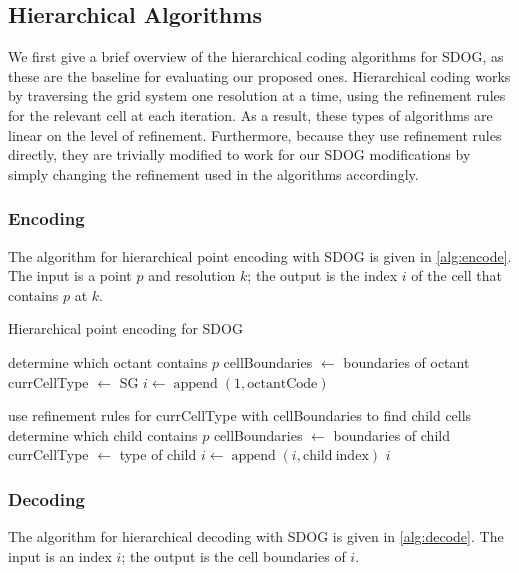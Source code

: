 \subsection{Hierarchical Algorithms}
We first give a brief overview of the hierarchical coding algorithms for SDOG, as these are the baseline for evaluating our proposed ones.
Hierarchical coding works by traversing the grid system one resolution at a time, using the refinement rules for the relevant cell at each iteration.
As a result, these types of algorithms are linear on the level of refinement.
Furthermore, because they use refinement rules directly, they are trivially modified to work for our SDOG modifications by simply changing the refinement used in the algorithms accordingly.


\subsubsection{Encoding}
The algorithm for hierarchical point encoding with SDOG is given in \cref{alg:encode}.
The input is a point $p$ and resolution $k$; the output is the index $i$ of the cell that contains $p$ at $k$.


\begin{algorithm}[htp!]
	\caption{Hierarchical point encoding for SDOG}
	
	\begin{algorithmic}
		
		\STATE determine which octant contains $p$
		\STATE cellBoundaries $\leftarrow$ boundaries of octant
		\STATE currCellType $\leftarrow$ SG
		\STATE $i \leftarrow \operatorname{append}(1, \mathrm{octantCode})$
		
		\STATE use refinement rules for currCellType with cellBoundaries to find child cells
		\STATE determine which child contains $p$
		\STATE cellBoundaries $\leftarrow$ boundaries of child
		\STATE currCellType $\leftarrow$ type of child
		\STATE $i \leftarrow \operatorname{append}(i, \mathrm{child~index})$
		\ENDFOR
		\RETURN $i$
		
	\end{algorithmic}
	\label{alg:encode}
\end{algorithm}


\subsubsection{Decoding}
The algorithm for hierarchical decoding with SDOG is given in \cref{alg:decode}.
The input is an index $i$; the output is the cell boundaries of $i$.


